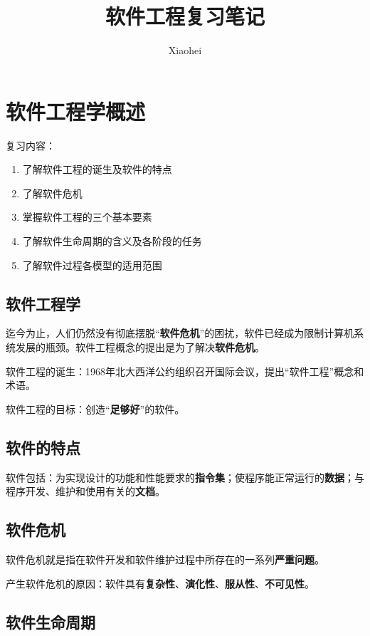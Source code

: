 \documentclass[cn, blue, normal, 12pt]{elegantnote}
\title{软件工程复习笔记}
\author{Xiaohei}
\institute{\href{https://github.com/Moby-C/SoftwareEngineeringNote}{GitHub Page}}
\date{\zhtoday}
\begin{document}
\maketitle

\section{软件工程学概述}

复习内容：

\begin{enumerate}
    \item 了解软件工程的诞生及软件的特点
    \item 了解软件危机
    \item 掌握软件工程的三个基本要素
    \item 了解软件生命周期的含义及各阶段的任务
    \item 了解软件过程各模型的适用范围
\end{enumerate}

\subsection{软件工程学}

迄今为止，人们仍然没有彻底摆脱“\textbf{软件危机}”的困扰，软件已经成为限制计算机系统发展的瓶颈。软件工程概念的提出是为了解决\textbf{软件危机}。

软件工程的诞生：1968年北大西洋公约组织召开国际会议，提出“软件工程”概念和术语。

软件工程的目标：创造“\textbf{足够好}”的软件。

\subsection{软件的特点}

软件包括：为实现设计的功能和性能要求的\textbf{指令集}；使程序能正常运行的\textbf{数据}；与程序开发、维护和使用有关的\textbf{文档}。

\subsection{软件危机}

软件危机就是指在软件开发和软件维护过程中所存在的一系列\textbf{严重问题}。

产生软件危机的原因：软件具有\textbf{复杂性}、\textbf{演化性}、\textbf{服从性}、\textbf{不可见性}。

\subsection{软件生命周期}
\end{document}
